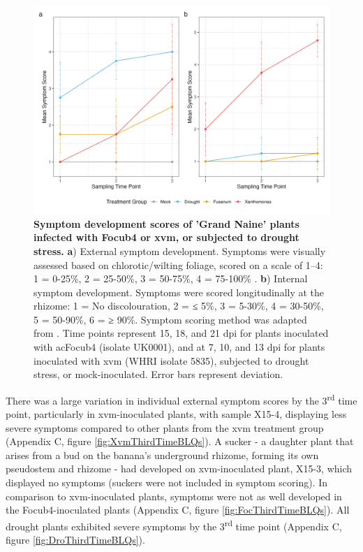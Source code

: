 \begin{figure}[p!]
  \centering
  \includegraphics[width=\textwidth]{Figures/Combined_Sympotoms_plot.png}
  \caption[Symptom development scores of 'Grand Naine' plants infected with \acl{Focub4} or \acl{xvm}, or subjected to drought stress.]{\textbf{Symptom development scores of 'Grand Naine' plants infected with \acf{Focub4} or \acf{xvm}, or subjected to drought stress.} \textbf{a}) External symptom development. Symptoms were visually assessed based on chlorotic/wilting foliage, scored on a scale of 1–4: 1 = 0-25\%, 2 = 25-50\%, 3 = 50-75\%, 4 = 75-100\% . \textbf{b}) Internal symptom development. Symptoms were scored longitudinally at the rhizome: 1 = No discolouration, 2 = ≤ 5\%, 3 = 5-30\%, 4 = 30-50\%, 5 = 50-90\%, 6 = ≥ 90\%. Symptom scoring method was adapted from \textcite{Garcia-Bastidas2019}. Time points represent 15, 18, and 21 \ac{dpi} for plants inoculated with ac{Focub4} (isolate UK0001), and at 7, 10, and 13 \ac{dpi} for plants inoculated with \ac{xvm} (WHRI isolate 5835), subjected to drought stress, or mock-inoculated. Error bars represent deviation.}
  \label{fig:SymptomDev}
\end{figure}
 
There was a large variation in individual external symptom scores by the 3\textsuperscript{rd} time point, particularly in \ac{xvm}-inoculated plants, with sample X15-4, displaying less severe symptoms compared to other plants from the \ac{xvm} treatment group (Appendix C, figure \ref{fig:XvmThirdTimeBLQs}). A sucker - a daughter plant that arises from a bud on the banana's underground rhizome, forming its own pseudostem and rhizome - had developed on \ac{xvm}-inoculated plant, X15-3, which displayed no symptoms (suckers were not included in symptom scoring). In comparison to \ac{xvm}-inoculated plants, symptoms were not as well developed in the \ac{Focub4}-inoculated plants (Appendix C, figure \ref{fig:FocThirdTimeBLQs}). All drought plants exhibited severe symptoms by the 3\textsuperscript{rd} time point (Appendix C, figure \ref{fig:DroThirdTimeBLQs}).


